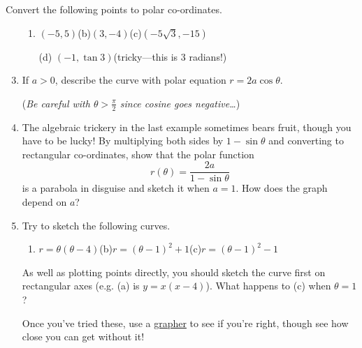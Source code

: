 \begin{exercises}{}{}
\exstart Convert the following points to polar co-ordinates.
\begin{enumerate}\setcounter{enumi}{1}
  \item[]\begin{enumerate}
    \item $(-5,5)$\qquad (b)\lstsp $(3,-4)$\qquad (c)\lstsp $(-5\sqrt 3,-15)$
    \item[(d)] $(-1,\tan 3)$\quad (tricky---this is 3 radians!)
  \end{enumerate}
  
  \item If $a>0$, describe the curve with polar equation $r=2a\cos\theta$.\par
  (\emph{Be careful with $\theta>\frac\pi 2$ since cosine goes negative\ldots})
  
  \item The algebraic trickery in the last example sometimes bears fruit, though you have to be lucky! By multiplying both sides by $1-\sin\theta$ and converting to rectangular co-ordinates, show that the polar function
	\[r(\theta)=\frac{2a}{1-\sin\theta}\]
	is a parabola in disguise and sketch it when $a=1$. How does the graph depend on $a$?
	 
  \item Try to sketch the following curves.
	\begin{enumerate}
  \item $r=\theta(\theta-4)$\qquad (b)\lstsp $r=(\theta-1)^2+1$\qquad (c)\lstsp $r=(\theta-1)^2-1$
	\end{enumerate}
	As well as plotting points directly, you should sketch the curve first on rectangular axes (e.g.{} (a) is $y=x(x-4)$). What happens to (c) when $\theta=1$?\par
	Once you've tried these, use a \href{https://www.desmos.com/calculator}{grapher} to see if you're right, though see how close you can get without it! 
\end{enumerate}
\end{exercises}


